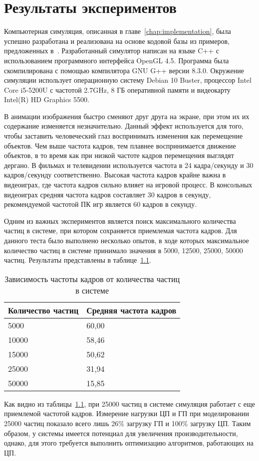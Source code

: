 \chapter{Результаты экспериментов}

Компьютерная симуляция, описанная в главе~\ref{chap:implementation}, была
успешно разработана и реализована на основе кодовой базы из примеров,
предложенных в~\cite{LearnOGL}. Разработанный симулятор написан на языке C++ с
использованием программного интерфейса OpenGL 4.5. Программа была скомпилирована
с помощью компилятора GNU G++ версии 8.3.0. Окружение симуляции использует
операционную систему Debian 10 Buster, процессор Intel Core i5-5200U с частотой
2.7GHz, 8 ГБ оперативной памяти и видеокарту Intel(R) HD Graphics 5500.

В анимации изображения быстро сменяют друг друга на экране, при этом их их
содержание изменяется незначительно. Данный эффект используется для того, чтобы
заставить человеческий глаз воспринимать изменения как перемещение объектов. Чем
выше частота кадров, тем плавнее воспринимается движение объектов, в то время
как при низкой частоте кадров перемещения выглядят дергано. В фильмах и
телевидении используется частота в 24 кадра/секунду и 30 кадров/секунду
соответственно. Высокая частота кадров крайне важна в видеоиграх, где частота
кадров сильно влияет на игровой процесс. В консольных видеоиграх средняя частота
кадров составляет 30 кадров в секунду, рекомендуемой частотой ПК игр является 60
кадров в секунду.

Одним из важных экспериментов является поиск максимального количества частиц в
системе, при котором сохраняется приемлемая частота кадров. Для данного теста
было выполнено несколько опытов, в ходе которых максимальное количество частиц в
системе принимало значения в 5000, 12500, 25000, 50000 частиц. Результаты
представлены в таблице~\ref{table:amountBench}.
\begin{table}[htb]
\caption{Зависимость частоты кадров от количества частиц в системе}%
\label{table:amountBench}
\centering
\small
\begin{tabular}{| l | l |}
    \hline
    Количество частиц & Средняя частота кадров \\
    \hline
    5000 &  60,00 \\
    \hline
    10000 & 58,46 \\
    \hline
    15000 & 50,62 \\
    \hline
    25000 & 31,94 \\
    \hline
    50000 & 15,85 \\
    \hline
\end{tabular}
\end{table}

Как видно из таблицы~\ref{table:amountBench}, при 25000 частиц в системе
симуляция работает с еще приемлемой частотой кадров. Измерение нагрузки ЦП и ГП
при моделировании 25000 частиц показало всего лишь 26\% загрузку ГП и 100\%
загрузку ЦП. Таким образом, у системы имеется потенциал для увеличения
производительности, однако, для этого требуется выполнить оптимизацию
алгоритмов, работающих на ЦП.
